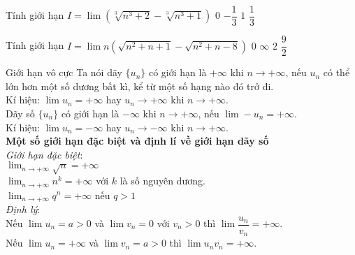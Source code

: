 \begin{ex}%
	Tính giới hạn $I = \lim \left(\sqrt[3]{n^3 + 2} - \sqrt[3]{n^3 + 1}\right)$
	\choice
	{\True $0$}
	{$-\dfrac{1}{3}$}
	{$1$}
	{$\dfrac{1}{3}$}
\end{ex}
\begin{ex}%
	Tính giới hạn $I = \lim n\left(\sqrt{n^2 + n + 1} - \sqrt{n^2 + n - 8}\right)$
	\choice
	{$0$}
	{$\infty$}
	{$2$}
	{\True $\dfrac{9}{2}$}
\end{ex}
\begin{dang}{Giới hạn vô cực}
	Ta nói dãy $\{u_n\}$ có giới hạn là $+ \infty$ khi $n \rightarrow + \infty$, nếu $u_n$ có thể lớn hơn một số dương bất kì, kể từ một số hạng nào đó trở đi. \\
	Kí hiệu: $\lim u_n = + \infty$ hay $u_n \rightarrow + \infty$ khi $n \rightarrow + \infty$. \\ 
	Dãy số $\{u_n\}$ có giới hạn là $- \infty$ khi $n \rightarrow + \infty$, nếu $\lim - u_n = + \infty$. \\
	Kí hiệu: $\lim u_n = - \infty$ hay $u_n \rightarrow - \infty$ khi $n \rightarrow + \infty$. \\ 
	\textbf{Một số giới hạn đặc biệt và định lí về giới hạn dãy số} \\
	\textit{Giới hạn đặc biệt}: \\
	$\displaystyle \lim_{n \rightarrow + \infty} \sqrt{n} = + \infty$ \\
	$\displaystyle \lim_{n \rightarrow + \infty} n^k = + \infty$ với $k$ là số nguyên dương. \\
	$\displaystyle \lim_{n \rightarrow + \infty} q^n = + \infty$ nếu $q > 1$ \\
	\textit{Định lý}: \\
	Nếu $\lim u_n = a > 0$ và $\lim v_n = 0$ với $v_n > 0$ thì $\lim \dfrac{u_n}{v_n} = + \infty$. \\
	Nếu $\lim u_n = + \infty$ và $\lim v_n = a > 0$ thì $\lim u_nv_n = + \infty$.
\end{dang}
